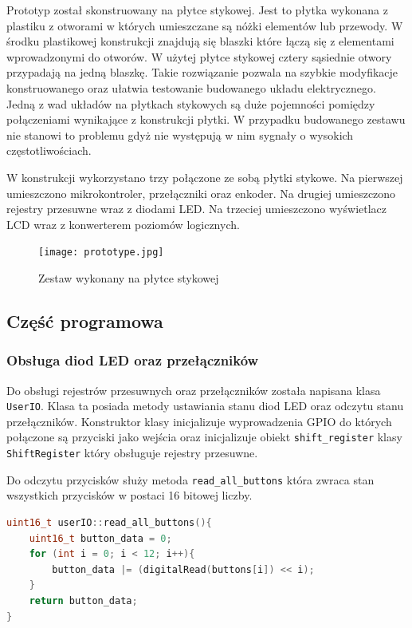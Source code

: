 \documentclass[../main.tex]{subfiles}
\begin{document}
Prototyp został skonstruowany na płytce stykowej. Jest to płytka wykonana z plastiku z otworami w których umieszczane są nóżki elementów lub przewody.
W środku plastikowej konstrukcji znajdują się blaszki które łączą się z elementami wprowadzonymi do otworów. W użytej płytce stykowej cztery sąsiednie
otwory przypadają na jedną blaszkę. Takie rozwiązanie pozwala na szybkie modyfikacje konstruowanego oraz ułatwia testowanie
budowanego układu elektrycznego. Jedną z wad układów na płytkach stykowych są duże pojemności pomiędzy połączeniami wynikające
z konstrukcji płytki. W przypadku budowanego zestawu nie stanowi to problemu gdyż nie występują w nim sygnały o wysokich częstotliwościach.

W konstrukcji wykorzystano trzy połączone ze sobą płytki stykowe. Na pierwszej umieszczono mikrokontroler, przełączniki oraz enkoder.
Na drugiej umieszczono rejestry przesuwne wraz z diodami LED. Na trzeciej umieszczono wyświetlacz LCD wraz z konwerterem poziomów logicznych.

\begin{figure}[H]
    \centering
    \texttt{[image: prototype.jpg]}
    \caption{Zestaw wykonany na płytce stykowej}    
    \label{fig:prototype}
\end{figure}


\subsection{Część programowa}

\subsubsection{Obsługa diod LED oraz przełączników}

Do obsługi rejestrów przesuwnych oraz przełączników została napisana klasa \texttt{UserIO}. Klasa ta posiada metody ustawiania stanu
diod LED oraz odczytu stanu przełączników. Konstruktor klasy inicjalizuje wyprowadzenia GPIO do których połączone są przyciski jako wejścia oraz
inicjalizuje obiekt \texttt{shift\_register} klasy \texttt{ShiftRegister} który obsługuje rejestry przesuwne. 
\par
Do odczytu przycisków służy metoda \texttt{read\_all\_buttons} która zwraca stan wszystkich przycisków w postaci 16 bitowej liczby.

\begin{lstlisting}[language=C++]
    uint16_t userIO::read_all_buttons(){
    uint16_t button_data = 0;
    for (int i = 0; i < 12; i++){
        button_data |= (digitalRead(buttons[i]) << i);
    }
    return button_data;
}
\end{lstlisting}
\end{document}
